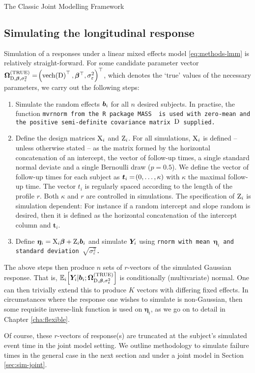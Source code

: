 \begin{chapter}{\label{cha:methods-classic}The Classic Joint Modelling Framework}
  \subsection{\label{sec:sim-longit}Simulating the longitudinal response}
  Simulation of a responses under a linear mixed effects model \eqref{eq:methods-lmm} is relatively straight-forward. For some candidate parameter vector $\bm{\mathrm{\Omega}}_{\mathrm{D},\bm{\beta},\sigma^2_\varepsilon}^{(\mathrm{TRUE})}=\!\left(\text{vech}\!\left(\mathrm{D}\right)^\top,\bm{\beta}^\top,\sigma^2_\varepsilon\right)^\top$, which denotes the `true' values of the necessary parameters, we carry out the following steps:
  \begin{enumerate}
      \item Simulate the random effects $\bm{b}_i$ for all $n$ desired subjects. In practise, the function \tt{mvrnorm} from the \tt{R} package \tt{MASS} \citep{R-MASS} is used with zero-mean and the positive semi-definite covariance matrix $\mathrm{D}$ supplied.
      \item Define the design matrices $\mathrm{X}_i$ and $\mathrm{Z}_i$. For all simulations, $\mathrm{X}_i$ is defined -- unless otherwise stated -- as the matrix formed by the horizontal concatenation of an intercept, the vector of follow-up times, a single standard normal deviate and a single Bernoulli draw ($p=0.5$). We define the vector of follow-up times for each subject as $\bm{t}_i=\!\left(0,\dots,\kappa\right)$ with $\kappa$ the maximal follow-up time. The vector $t_i$ is regularly spaced according to the length of the profile $r$. Both $\kappa$ and $r$ are controlled in simulations. The specification of $\mathrm{Z}_i$ is simulation dependent: For instance if a random intercept and slope random is desired, then it is defined as the horizontal concatenation of the intercept column and $\bm{t}_i$.
      \item Define $\bm{\eta}_i=\mathrm{X}_i\bm{\beta}+\mathrm{Z}_i\bm{b}_i$ and simulate $\bm{Y}_i$ using \tt{rnorm} with mean $\bm{\eta}_i$ and standard deviation $\sqrt{\sigma^2_\varepsilon}$.
  \end{enumerate}
  The above steps then produce $n$ sets of $r$-vectors of the simulated Gaussian response. That is, $\mathbb{E}_i\!\left[\bm{Y}_i|\bm{b}_i;\bm{\mathrm{\Omega}}_{\mathrm{D},\bm{\beta},\sigma^2_\varepsilon}^{(\mathrm{TRUE})}\right]$ is conditionally (multivariate) normal. One can then trivially extend this to produce $K$ vectors with differing \eg fixed effects. In circumstances where the response one wishes to simulate is non-Gaussian, then some requisite inverse-link function is used on $\bm{\eta}_i$, as we go on to detail in Chapter \ref{cha:flexible}. 
  
  Of course, these $r$-vectors of response(s) are truncated at the subject's simulated event time in the joint model setting. We outline methodology to simulate failure times in the general case in the next section and under a joint model in Section \ref{sec:sim-joint}.


\end{chapter}
